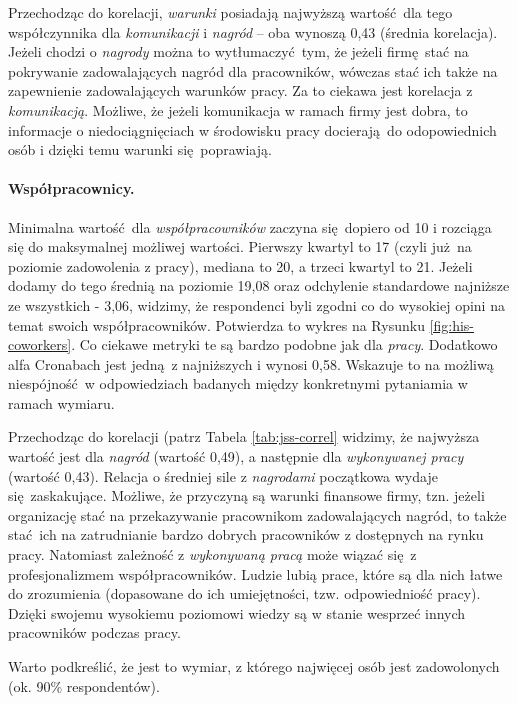 Przechodząc do korelacji, \textit{warunki} posiadają najwyższą wartość dla tego współczynnika dla \textit{komunikacji} i \textit{nagród} -- oba wynoszą 0,43 (średnia korelacja). Jeżeli chodzi o \textit{nagrody} można to wytłumaczyć tym, że jeżeli firmę stać na pokrywanie zadowalających nagród dla pracowników, wówczas stać ich także na zapewnienie zadowalających warunków pracy. Za to ciekawa jest korelacja z \textit{komunikacją}. Możliwe, że jeżeli komunikacja w ramach firmy jest dobra, to informacje o niedociągnięciach w
środowisku pracy docierają do odopowiednich osób i dzięki temu warunki się poprawiają. 

\paragraph{Współpracownicy.} Minimalna wartość dla \textit{współpracowników} zaczyna się dopiero od 10 i rozciąga się do maksymalnej możliwej wartości. Pierwszy kwartyl to 17 (czyli już na poziomie zadowolenia z pracy), mediana to 20, a trzeci kwartyl to 21. Jeżeli dodamy do tego średnią na poziomie 19,08 oraz odchylenie standardowe najniższe ze wszystkich - 3,06, widzimy, że respondenci byli zgodni co do wysokiej opini na temat swoich współpracowników. Potwierdza to wykres
na Rysunku \ref{fig:his-coworkers}. Co ciekawe metryki te są bardzo podobne jak dla \textit{pracy}. Dodatkowo alfa Cronabach jest jedną z najniższych i wynosi 0,58. Wskazuje to na możliwą niespójność w odpowiedziach badanych między konkretnymi pytaniamia w ramach wymiaru.

Przechodząc do korelacji (patrz Tabela \ref{tab:jss-correl} widzimy, że najwyższa wartość jest dla \textit{nagród} (wartość 0,49), a następnie dla \textit{wykonywanej pracy} (wartość 0,43). Relacja o średniej sile z \textit{nagrodami} początkowa wydaje się zaskakujące. Możliwe, że przyczyną są warunki finansowe firmy, tzn. jeżeli organizację stać na przekazywanie pracownikom zadowalających nagród, to także stać ich na zatrudnianie bardzo dobrych pracowników z dostępnych
na rynku pracy. Natomiast zależność z \textit{wykonywaną pracą} może wiązać się z profesjonalizmem współpracowników. Ludzie lubią prace, które są dla nich łatwe do zrozumienia (dopasowane do ich umiejętności, tzw. odpowiedniość pracy). Dzięki swojemu wysokiemu poziomowi wiedzy są w stanie wesprzeć innych pracowników podczas pracy.

Warto podkreślić, że jest to wymiar, z którego najwięcej osób jest zadowolonych (ok. 90\% respondentów).

